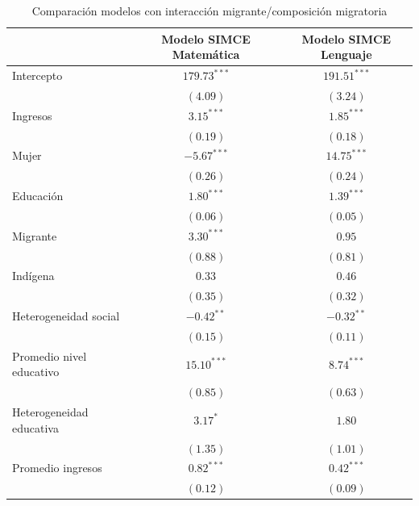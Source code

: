 \documentclass[
]{article}
\begin{document}
\begin{table}
\caption{Comparación modelos con interacción migrante/composición migratoria}
\begin{center}
\begin{tabular}{l c c}
\hline
 & Modelo SIMCE Matemática & Modelo SIMCE Lenguaje \\
\hline
Intercepto                          & $179.73^{***}$ & $191.51^{***}$ \\
                                    & $(4.09)$       & $(3.24)$       \\
Ingresos                            & $3.15^{***}$   & $1.85^{***}$   \\
                                    & $(0.19)$       & $(0.18)$       \\
Mujer                               & $-5.67^{***}$  & $14.75^{***}$  \\
                                    & $(0.26)$       & $(0.24)$       \\
Educación                           & $1.80^{***}$   & $1.39^{***}$   \\
                                    & $(0.06)$       & $(0.05)$       \\
Migrante                            & $3.30^{***}$   & $0.95$         \\
                                    & $(0.88)$       & $(0.81)$       \\
Indígena                            & $0.33$         & $0.46$         \\
                                    & $(0.35)$       & $(0.32)$       \\
Heterogeneidad social               & $-0.42^{**}$   & $-0.32^{**}$   \\
                                    & $(0.15)$       & $(0.11)$       \\
Promedio nivel educativo            & $15.10^{***}$  & $8.74^{***}$   \\
                                    & $(0.85)$       & $(0.63)$       \\
Heterogeneidad educativa            & $3.17^{*}$     & $1.80$         \\
                                    & $(1.35)$       & $(1.01)$       \\
Promedio ingresos                   & $0.82^{***}$   & $0.42^{***}$   \\
                                    & $(0.12)$       & $(0.09)$       \\

\end{tabular}
\end{center}
\end{table}
\end{document}
